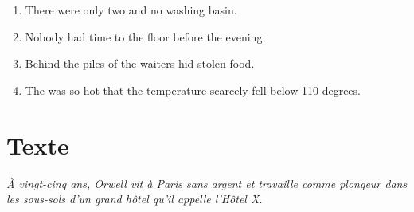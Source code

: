 \documentclass{fiche}
\begin{document}
\begin{anglais}
\begin{enumerate}[label=\arabic*.,itemsep=2mm,leftmargin=*]
  \item There were only two  and no washing basin.
  \item Nobody had time to  the floor before the evening.
  \item Behind the piles of  the waiters hid stolen food.
  \item The  was so hot that the temperature scarcely fell below 110 degrees.
\end{enumerate}
\end{anglais}

\newpage
\section{Texte}

\noindent\small\textit{À vingt-cinq ans, Orwell vit à Paris sans argent et travaille comme
plongeur dans les sous-sols d'un grand hôtel qu'il appelle l'Hôtel X.}\normalsize
\end{document}
